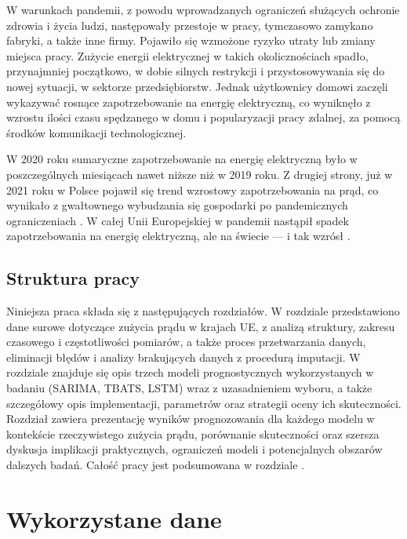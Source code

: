 \documentclass[polish, twoside, 12pt, a4paper]{article}
\theoremstyle{definition}
\theoremstyle{plain}
\theoremstyle{remark}
\begin{document}
W warunkach pandemii, z powodu wprowadzanych ograniczeń służących ochronie zdrowia i życia ludzi, następowały przestoje w pracy, tymczasowo zamykano fabryki, a także inne firmy. Pojawiło się wzmożone ryzyko utraty lub zmiany miejsca pracy. Zużycie energii elektrycznej w takich okolicznościach spadło, przynajmniej początkowo, w dobie silnych restrykcji i przystosowywania się do nowej sytuacji, w sektorze przedsiębiorstw. Jednak użytkownicy domowi zaczęli wykazywać rosnące zapotrzebowanie na energię elektryczną, co wyniknęło z wzrostu ilości czasu spędzanego w domu i popularyzacji pracy zdalnej, za pomocą środków komunikacji technologicznej. 

W 2020 roku sumaryczne zapotrzebowanie na energię elektryczną było w poszczególnych miesiącach nawet niższe niż w 2019 roku. Z drugiej strony, już w 2021 roku w Polsce pojawił się trend wzrostowy zapotrzebowania na prąd, co wynikało z gwałtownego wybudzania się gospodarki po pandemicznych ograniczeniach \citep{smyk2021}. W całej Unii Europejskiej w pandemii nastąpił spadek zapotrzebowania na energię elektryczną, ale na świecie --- i tak wzrósł \citep{maciuch2023}. 

\subsection{Struktura pracy}

Niniejsza praca składa się z następujących rozdziałów. W rozdziale \textit{} przedstawiono dane surowe dotyczące zużycia prądu w krajach UE, z analizą struktury, zakresu czasowego i częstotliwości pomiarów, a także proces przetwarzania danych, eliminacji błędów i analizy brakujących danych z procedurą imputacji. W rozdziale \textit{} znajduje się opis trzech modeli prognostycznych wykorzystanych w badaniu (SARIMA, TBATS, LSTM) wraz z uzasadnieniem wyboru, a także szczegółowy opis implementacji, parametrów oraz strategii oceny ich skuteczności. Rozdział \textit{} zawiera prezentację wyników prognozowania dla każdego modelu w kontekście rzeczywistego zużycia prądu, porównanie skuteczności oraz szersza dyskusja implikacji praktycznych, ograniczeń modeli i potencjalnych obszarów dalszych badań. Całość pracy jest podsumowana w rozdziale \textit{}.


\clearpage
\section{Wykorzystane dane}\label{sec:dane}
\end{document}
